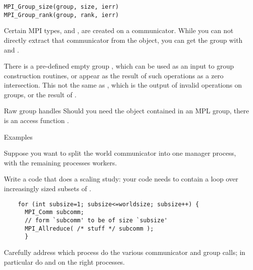 \begin{lstlisting}
MPI_Group_size(group, size, ierr)
MPI_Group_rank(group, rank, ierr)
\end{lstlisting}

Certain MPI types,  and ,
are created on a communicator.
While you can not directly extract that communicator from the object,
you can get the group with
 and .

There is a pre-defined empty group ,
which can be used as an input to group construction routines,
or appear as the result of such operations as a zero intersection.
This not the same as ,
which is the output of invalid operations on groups,
or the result of .

\begin{mplnote}{Raw group handles}
  Should you need the  object
  contained in an MPL group,
  there is an access function .
\end{mplnote}

 {Examples}

Suppose you want to split the world communicator into
one manager process, with the remaining processes workers.
%

\begin{exercise}[subgroup]
  \label{ex:comm-saling}
  Write a code that does a scaling study: your code needs to
  contain a loop over increasingly sized subsets of .
  \begin{lstlisting}
    for (int subsize=1; subsize<=worldsize; subsize++) {
      MPI_Comm subcomm;
      // form `subcomm' to be of size `subsize'
      MPI_Allreduce( /* stuff */ subcomm );
      }
  \end{lstlisting}
  Carefully address which process do the various communicator and group calls;
  in particular do  and 
  on the right processes.
\end{exercise}
